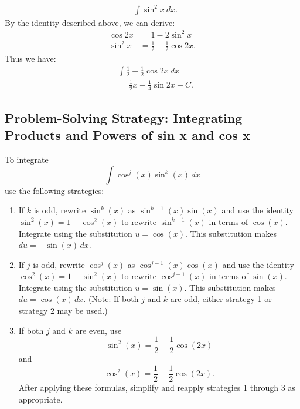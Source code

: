 \documentclass{report}
\begin{document}
        \bigbreak \noindent 
        \begin{eg}[Evaluate]
           \begin{align*}
               &\int \sin^{2}{x}\ dx
           .\end{align*} 
           \bigbreak \noindent 
           By the identity described above, we can derive:
           \begin{align*}
               \cos{2x} &= 1-2\sin^{2}{x} \\
               \sin^{2}{x} &= \frac{1}{2}-\frac{1}{2}\cos{2x} 
           .\end{align*}
           \bigbreak \noindent 
           Thus we have:
           \begin{align*}
               &\int \frac{1}{2}-\frac{1}{2}\cos{2x}\ dx \\
               &=\frac{1}{2}x - \frac{1}{4}\sin{2x} + C
           .\end{align*}
        \end{eg}

        \pagebreak 
        \subsection*{Problem-Solving Strategy: Integrating Products and Powers of sin x and cos x}
        \bigbreak \noindent 
        To integrate 
\[
\int \cos^j(x) \sin^k(x) \, dx
\]
use the following strategies:

\begin{enumerate}
    \item If \( k \) is odd, rewrite \( \sin^k(x) \) as \( \sin^{k-1}(x) \sin(x) \) and use the identity \( \sin^2(x) = 1 - \cos^2(x) \) to rewrite \( \sin^{k-1}(x) \) in terms of \( \cos(x) \). Integrate using the substitution \( u = \cos(x) \). This substitution makes \( du = -\sin(x) \, dx \).
    
    \item If \( j \) is odd, rewrite \( \cos^j(x) \) as \( \cos^{j-1}(x) \cos(x) \) and use the identity \( \cos^2(x) = 1 - \sin^2(x) \) to rewrite \( \cos^{j-1}(x) \) in terms of \( \sin(x) \). Integrate using the substitution \( u = \sin(x) \). This substitution makes \( du = \cos(x) \, dx \). (Note: If both \( j \) and \( k \) are odd, either strategy 1 or strategy 2 may be used.)
    
    \item If both \( j \) and \( k \) are even, use 
    \[
    \sin^2(x) = \frac{1}{2} - \frac{1}{2} \cos(2x)
    \]
    and 
    \[
    \cos^2(x) = \frac{1}{2} + \frac{1}{2} \cos(2x).
    \]
    After applying these formulas, simplify and reapply strategies 1 through 3 as appropriate.
\end{enumerate}
\end{document}
